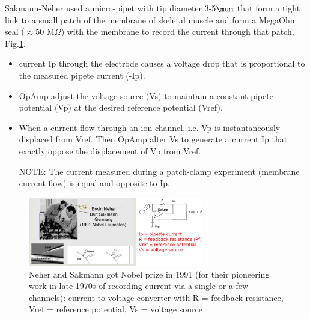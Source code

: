 Sakmann-Neher used a micro-pipet with tip diameter 3-5$\mum$ that form a tight
link to a small patch of the membrane of skeletal muscle and form a MegaOhm seal
($\approx 50$ M$\Omega$) with the membrane to record the current through that
patch, Fig.\ref{fig:patch-clamp}.
\begin{itemize}
  \item current Ip through the electrode causes a voltage drop that is
  proportional to the measured pipete current (-Ip).

  \item OpAmp adjust the voltage source (Vs) to maintain a constant pipete
  potential (Vp) at the desired reference potential (Vref).

  \item When a current flow through an ion channel,  i.e. Vp is instantaneously
  displaced from Vref. Then OpAmp alter Vs to generate a current Ip that exactly
  oppose the displacement of Vp from Vref.

NOTE: The current measured during a patch-clamp experiment (membrane current
flow) is equal and opposite to Ip.
\end{itemize}

\begin{figure}[hbt]
  \centerline{\includegraphics[height=3cm,
    angle=0]{./images/patch-clamp.eps}}
  \caption{Neher and Sakmann got Nobel prize in 1991 (for their pioneering work
  in late 1970s of recording current via a single or a few channels):
  current-to-voltage converter with R = feedback resistance, Vref = reference potential, Vs =
  voltage source}
\label{fig:patch-clamp}
\end{figure}

